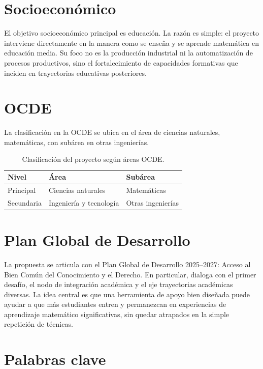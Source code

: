 \documentclass[11pt,spanish,letterpaper,openany]{book}
\begin{document}
\section{Socioeconómico}

El objetivo socioeconómico principal es educación. La razón es simple: el proyecto interviene directamente en la manera como se enseña y se aprende matemática en educación media. Su foco no es la producción industrial ni la automatización de procesos productivos, sino el fortalecimiento de capacidades formativas que inciden en trayectorias educativas posteriores.

\section{OCDE}

La clasificación en la OCDE se ubica en el área de ciencias naturales, matemáticas, con subárea en otras ingenierías.

\begin{table}[H]
\centering
\caption{Clasificación del proyecto según áreas OCDE.}
\begin{tabularx}{\textwidth}{>{\raggedright\arraybackslash}p{2.8cm} >{\raggedright\arraybackslash}p{4.8cm} >{\raggedright\arraybackslash}X}
\toprule
Nivel & Área & Subárea \\
\midrule
Principal & Ciencias naturales & Matemáticas \\
Secundaria & Ingeniería y tecnología & Otras ingenierías \\
\bottomrule
\end{tabularx}
\end{table}

\section{Plan Global de Desarrollo}

La propuesta se articula con el Plan Global de Desarrollo 2025--2027: Acceso al Bien Común del Conocimiento y el Derecho. En particular, dialoga con el primer desafío, el nodo de integración académica y el eje trayectorias académicas diversas. La idea central es que una herramienta de apoyo bien diseñada puede ayudar a que más estudiantes entren y permanezcan en experiencias de aprendizaje matemático significativas, sin quedar atrapados en la simple repetición de técnicas.

\section{Palabras clave}
\end{document}
